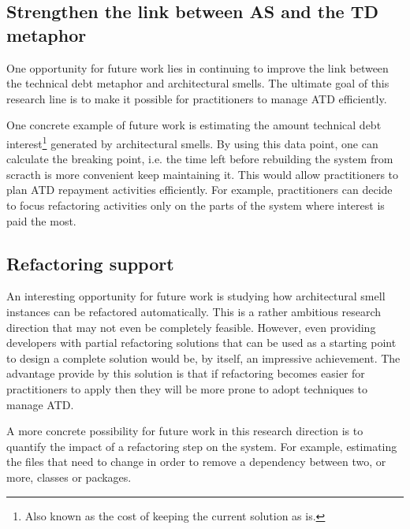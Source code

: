 \subsection{Strengthen the link between AS and the TD metaphor}
One opportunity for future work lies in continuing to improve the link between the technical debt metaphor and architectural smells.
The ultimate goal of this research line is to make it possible for practitioners to manage ATD efficiently.

One concrete example of future work is estimating the amount technical debt interest\footnote{Also known as the cost of keeping the current solution as is.} generated by architectural smells.
By using this data point, one can calculate the breaking point, i.e. the time left before rebuilding the system from scracth is more convenient keep maintaining it.
This would allow practitioners to plan ATD repayment activities efficiently.
For example, practitioners can decide to focus refactoring activities only on the parts of the system where interest is paid the most.


\subsection{Refactoring support}
An interesting opportunity for future work is studying how architectural smell instances can be refactored automatically.
This is a rather ambitious research direction that may not even be completely feasible.
However, even providing developers with partial refactoring solutions that can be used as a starting point to design a complete solution would be, by itself, an impressive achievement.
The advantage provide by this solution is that if refactoring becomes easier for practitioners to apply then they will be more prone to adopt techniques to manage ATD.

A more concrete possibility for future work in this research direction is to quantify the impact of a refactoring step  on the system.
For example, estimating the files that need to change in order to remove a dependency between two, or more, classes or packages.







